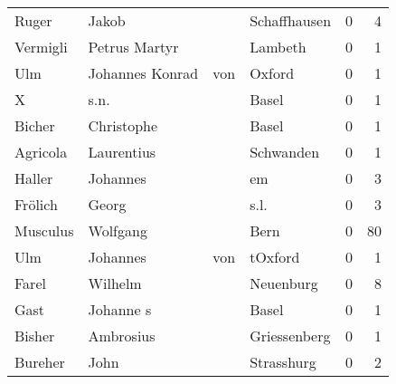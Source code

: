 \begin{center}
\begin{tiny}
\begin{longtabu}{llllrr}
                    Ruger &                              Jakob &             &                                Schaffhausen &          0 &         4 \\
                 Vermigli &                      Petrus Martyr &             &                                     Lambeth &          0 &         1 \\
                      Ulm &                    Johannes Konrad &         von &                                      Oxford &          0 &         1 \\
                        X &                               s.n. &             &                                       Basel &          0 &         1 \\
                   Bicher &                         Christophe &             &                                       Basel &          0 &         1 \\
                 Agricola &                         Laurentius &             &                                   Schwanden &          0 &         1 \\
                   Haller &                           Johannes &             &                                          em &          0 &         3 \\
                  Frölich &                              Georg &             &                                        s.l. &          0 &         3 \\
                 Musculus &                           Wolfgang &             &                                        Bern &          0 &        80 \\
                      Ulm &                           Johannes &         von &                                     tOxford &          0 &         1 \\
                    Farel &                            Wilhelm &             &                                   Neuenburg &          0 &         8 \\
                     Gast &                          Johanne s &             &                                       Basel &          0 &         1 \\
                   Bisher &                          Ambrosius &             &                                Griessenberg &          0 &         1 \\
                  Bureher &                               John &             &                                  Strasshurg &          0 &         2 \\

\end{longtabu}
\end{tiny}
\end{center}
